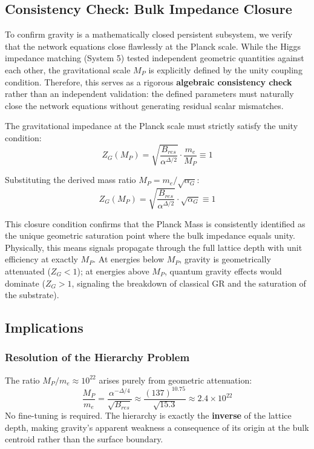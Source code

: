 \subsection{Consistency Check: Bulk Impedance Closure}
To confirm gravity is a mathematically closed persistent subsystem, we verify that the network equations close flawlessly at the Planck scale. While the Higgs impedance matching (System 5) tested independent geometric quantities against each other, the gravitational scale $M_P$ is explicitly defined by the unity coupling condition. Therefore, this serves as a rigorous \textbf{algebraic consistency check} rather than an independent validation: the defined parameters must naturally close the network equations without generating residual scalar mismatches.

The gravitational impedance at the Planck scale must strictly satisfy the unity condition:
\begin{equation}
Z_G(M_P) = \sqrt{\frac{B_{res}}{\alpha^{\Delta/2}}} \cdot \frac{m_e}{M_P} \equiv 1
\end{equation}

Substituting the derived mass ratio $M_P = m_e / \sqrt{\alpha_G}$:
\begin{equation}
Z_G(M_P) = \sqrt{\frac{B_{res}}{\alpha^{\Delta/2}}} \cdot \sqrt{\alpha_G} \equiv 1
\end{equation}

This closure condition confirms that the Planck Mass is consistently identified as the unique geometric saturation point where the bulk impedance equals unity. Physically, this means signals propagate through the full lattice depth with unit efficiency at exactly $M_P$. At energies below $M_P$, gravity is geometrically attenuated ($Z_G < 1$); at energies above $M_P$, quantum gravity effects would dominate ($Z_G > 1$, signaling the breakdown of classical GR and the saturation of the substrate).

\subsection{Implications}

\subsubsection{Resolution of the Hierarchy Problem}
The ratio $M_P/m_e \approx 10^{22}$ arises purely from geometric attenuation:
\begin{equation}
\frac{M_P}{m_e} = \frac{\alpha^{-\Delta/4}}{\sqrt{B_{res}}} \approx \frac{(137)^{10.75}}{\sqrt{15.3}} \approx 2.4 \times 10^{22}
\end{equation}
No fine-tuning is required. The hierarchy is exactly the \textbf{inverse} of the lattice depth, making gravity's apparent weakness a consequence of its origin at the bulk centroid rather than the surface boundary.

